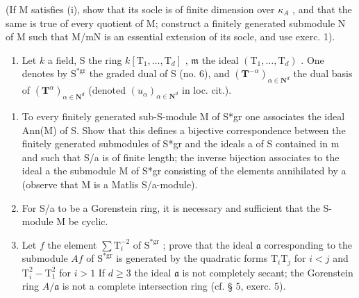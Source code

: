 (If M satisfies (i), show that its socle is of finite dimension over \(\kappa_{A}\) , and that the same is true of every quotient of M; construct a finitely generated submodule N of M such that M/mN is an essential extension of its socle, and use exerc. 1).

\begin{enumerate}
\def\labelenumi{\arabic{enumi})}
\setcounter{enumi}{2}
\tightlist
\item
  Let \(k\) a field, S the ring \(k[\mathrm{T}_{1},\ldots ,\mathrm{T}_{d}]\) , \(\mathfrak{m}\) the ideal \((\mathrm{T}_1,\dots ,\mathrm{T}_d)\) . One denotes by \(\mathrm{S^{*gr}}\) the graded dual of S (no. 6), and \((\mathbf{T}^{-\alpha})_{\alpha \in \mathbf{N}^d}\) the dual basis of \((\mathbf{T}^{\alpha})_{\alpha \in \mathbf{N}^d}\) (denoted \((u_{\alpha})_{\alpha \in \mathbf{N}^d}\) in loc. cit.).
\end{enumerate}

\begin{enumerate}
\def\labelenumi{\alph{enumi})}
\item
  To every finitely generated sub-S-module M of S*gr one associates the ideal Ann(M) of S. Show that this defines a bijective correspondence between the finitely generated submodules of S*gr and the ideals a of S contained in m and such that S/a is of finite length; the inverse bijection associates to the ideal a the submodule M of S*gr consisting of the elements annihilated by a (observe that M is a Matlis S/a-module).
\item
  For S/a to be a Gorenstein ring, it is necessary and sufficient that the S-module M be cyclic.
\item
  Let \(f\) the element \(\sum \mathrm{T}_i^{-2}\) of \(\mathrm{S}^{*\mathrm{gr}}\) ; prove that the ideal \(\mathfrak{a}\) corresponding to the submodule \(A f\) of \(\mathrm{S}^{*\mathrm{gr}}\) is generated by the quadratic forms \(\mathrm{T}_i\mathrm{T}_j\) for \(i < j\) and \(\mathrm{T}_i^2 - \mathrm{T}_1^2\) for \(i > 1\) If \(d \geqslant 3\) the ideal \(\mathfrak{a}\) is not completely secant; the Gorenstein ring \(A / \mathfrak{a}\) is not a complete intersection ring (cf. § 5, exerc. 5).
\end{enumerate}

